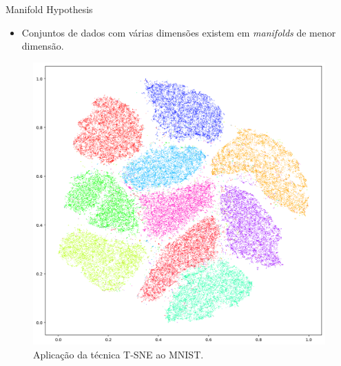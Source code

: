 \documentclass[dvipsnames]{beamer}
\begin{document}
\begin{frame}{Manifold Hypothesis}

	\begin{itemize}
		\item Conjuntos de dados com várias dimensões existem em \emph{manifolds} de menor dimensão.
	\end{itemize}

	\begin{figure}
		\centering
		\includegraphics[scale=0.2]{img/tsne-mnist.png}
		\caption{Aplicação da técnica T-SNE ao MNIST.}
	\end{figure}

\end{frame}
\end{document}
